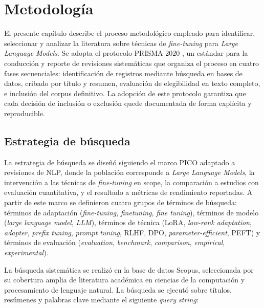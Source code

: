 \chapter{Metodología}

El presente capítulo describe el proceso metodológico empleado para identificar, seleccionar y analizar la literatura sobre técnicas de \textit{fine-tuning} para \textit{Large Language Models}. Se adopta el protocolo PRISMA 2020 \parencite[p.~796]{page2021prisma}, un estándar para la conducción y reporte de revisiones sistemáticas que organiza el proceso en cuatro fases secuenciales: identificación de registros mediante búsqueda en bases de datos, cribado por título y resumen, evaluación de elegibilidad en texto completo, e inclusión del corpus definitivo. La adopción de este protocolo garantiza que cada decisión de inclusión o exclusión quede documentada de forma explícita y reproducible.

\section{Estrategia de búsqueda}

La estrategia de búsqueda se diseñó siguiendo el marco PICO adaptado a revisiones de NLP, donde la población corresponde a \textit{Large Language Models}, la intervención a las técnicas de \textit{fine-tuning} en scope, la comparación a estudios con evaluación cuantitativa, y el resultado a métricas de rendimiento reportadas. A partir de este marco se definieron cuatro grupos de términos de búsqueda: términos de adaptación (\textit{fine-tuning}, \textit{finetuning}, \textit{fine tuning}), términos de modelo (\textit{large language model}, \textit{LLM}), términos de técnica (LoRA, \textit{low-rank adaptation}, \textit{adapter}, \textit{prefix tuning}, \textit{prompt tuning}, RLHF, DPO, \textit{parameter-efficient}, PEFT) y términos de evaluación (\textit{evaluation}, \textit{benchmark}, \textit{comparison}, \textit{empirical}, \textit{experimental}).

La búsqueda sistemática se realizó en la base de datos Scopus, seleccionada por su cobertura amplia de literatura académica en ciencias de la computación y procesamiento de lenguaje natural. La búsqueda se ejecutó sobre títulos, resúmenes y palabras clave mediante el siguiente \textit{query string}:

